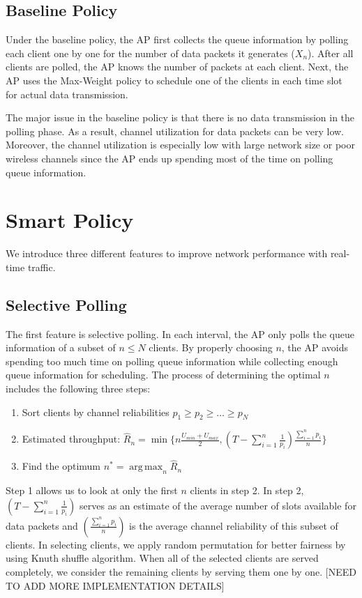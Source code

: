 \documentclass{article}
\DeclareMathOperator*{\argmax}{arg\,max}
\begin{document}
\subsection{Baseline Policy}
Under the baseline policy, the AP first collects the queue information by polling each client one by one for the number of data packets it generates ($X_n$). After all clients are polled, the AP knows the number of packets at each client. Next, the AP uses the Max-Weight policy to schedule one of the clients in each time slot for actual data transmission. 

The major issue in the baseline policy is that there is no data transmission in the polling phase. As a result, channel utilization for data packets can be very low. Moreover, the channel utilization is especially low with large network size or poor wireless channels since the AP ends up spending most of the time on polling queue information.

\section{Smart Policy}

We introduce three different features to improve network performance with real-time traffic.
\subsection{Selective Polling}
The first feature is selective polling. In each interval, the AP only polls the queue information of a subset of $n \le N $ clients. By properly choosing $n$, the AP avoids spending too much time on polling queue information while collecting enough queue information for scheduling. The process of determining the optimal $n$ includes the following three steps:
\begin{enumerate}
\item Sort clients by channel reliabilities $p_1 \geq p_2 \geq \dots \geq p_N$
\item Estimated throughput: $\hat{R}_n = \min\{n\frac{U_{min}+U_{max}}{2}, (T-\sum_{i=1}^{n}\frac{1}{p_i})\frac{\sum_{i=1}^{n}p_i}{n} \}$
\item Find the optimum $n^* = \argmax_{n} \hat{R}_n$
\end{enumerate}
Step 1 allows us to look at only the first $n$ clients in step 2. In step 2, $(T-\sum_{i=1}^{n}\frac{1}{p_i})$ serves as an estimate of the average number of slots available for data packets and $(\frac{\sum_{i=1}^{n}p_i}{n})$ is the average channel reliability of this subset of clients.
In selecting clients, we apply random permutation for better fairness by using Knuth shuffle algorithm. When all of the selected clients are served completely, we consider the  remaining clients by serving them one by one.
[NEED TO ADD MORE IMPLEMENTATION DETAILS]
\end{document}

